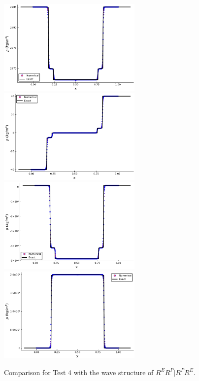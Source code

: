\documentclass{article}
\numberwithin{equation}{section}
\numberwithin{table}{section}
\begin{document}
\begin{figure}[ht]
  \centering

 \includegraphics[width= 7cm] {case3rho.pdf}
  \includegraphics[width= 7cm] {case3u.pdf}
  \includegraphics[width= 7cm] {case3p.pdf}
  \includegraphics[width= 7cm] {case3sxx.pdf}

    \caption{Comparison for Test 4 with the wave structure of $R^ER^P|R^PR^E$.  }
  \label{fig:case4}
\end{figure}
\end{document}
